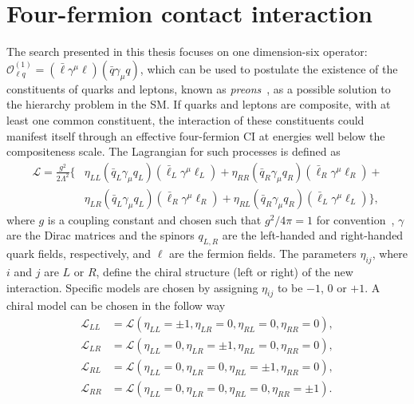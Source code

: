 \section{Four-fermion contact interaction}\label{sec:bsm:ci}
The search presented in this thesis focuses on one dimension-six operator: $\mathcal{O}^{(1)}_{\ell q} = (\bar{\ell}\gamma^\mu \ell)(\bar{q}\gamma_\mu q)$, which can be used to postulate the existence of the constituents of quarks and leptons, known as \emph{preons}~\cite{Eichten:1984eu,Eichten:1983hw}, as a possible solution to the hierarchy problem in the SM. If quarks and leptons are composite, with at least one common constituent, the interaction of these constituents could manifest itself through an effective four-fermion CI at energies well below the compositeness scale. The Lagrangian for such processes is defined as 
\begin{equation}
\label{eq:CIlagrangian}
\begin{aligned}
\mathcal L = \frac{g^2}{2\Lambda^2} \{
    &\eta_{LL}\left(\bar{q}_L\gamma_{\mu}q_L\right)\left(\bar{\ell}_L\gamma^{\mu}\ell_L\right) + \eta_{RR}\left(\bar{q}_R\gamma_{\mu}q_R\right)\left(\bar{\ell}_R\gamma^{\mu}\ell_R\right) + \\
    &\eta_{LR}\left(\bar{q}_L\gamma_{\mu}q_L\right)\left(\bar{\ell}_R\gamma^{\mu}\ell_R\right) + \eta_{RL}\left(\bar{q}_R\gamma_{\mu}q_R\right)\left(\bar{\ell}_L\gamma^{\mu}\ell_L\right)\},
\end{aligned}
\end{equation}
where $g$ is a coupling constant and chosen such that $g^2/4\pi = 1$ for convention~\cite{Eichten:1984eu}, $\gamma$ are the Dirac matrices and the spinors $q_{L,R}$ are the left-handed and right-handed quark fields, respectively, and $\ell$ are the fermion fields. The parameters $\eta_{ij}$, where $i$ and $j$ are $L$ or $R$, define the chiral structure (left or right) of the new interaction. Specific models are chosen by assigning $\eta_{ij}$ to be $-1$, $0$ or $+1$. A chiral model can be chosen in the follow way
\begin{equation}
    \label{eq:chiral}
    \begin{aligned}
    \mathcal{L}_{LL} &=  \mathcal{L}(\eta_{LL} = \pm1,\eta_{LR} = 0,\eta_{RL} = 0,\eta_{RR} =0), \\
    \mathcal{L}_{LR} &=  \mathcal{L}(\eta_{LL} = 0,\eta_{LR} = \pm1,\eta_{RL} = 0,\eta_{RR} =0), \\
    \mathcal{L}_{RL} &=  \mathcal{L}(\eta_{LL} = 0,\eta_{LR} = 0,\eta_{RL} = \pm1,\eta_{RR} =0), \\
    \mathcal{L}_{RR} &=  \mathcal{L}(\eta_{LL} = 0,\eta_{LR} = 0,\eta_{RL} = 0,\eta_{RR} =\pm1). 
    \end{aligned}
\end{equation}

